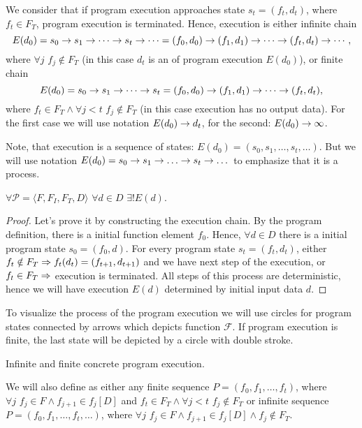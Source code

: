 We consider that if program execution approaches state $s_t = (f_t, d_t)$,
where $f_t \in F_T$, program execution is terminated.
Hence, execution is either infinite chain
\[E(d_0) = s_0 \rightarrow s_1 \rightarrow \cdots \rightarrow s_t \rightarrow \cdots =
        (f_0, d_0) \rightarrow (f_1, d_1) \rightarrow \cdots \rightarrow (f_t, d_t) \rightarrow \cdots,\]
where $\forall j \,\, f_j \notin F_T$ (in this case $d_t$ is an
 of program execution $E(d_0)$),
or finite chain
\[E(d_0) = s_0 \rightarrow s_1 \rightarrow \cdots \rightarrow s_t =
        (f_0, d_0) \rightarrow (f_1, d_1) \rightarrow \cdots \rightarrow (f_t, d_t),\]
where $f_t \in F_T \land \forall j < t \,\, f_j \notin F_T$
(in this case execution has no output data).
For the first case we will use notation $E(d_0) \rightarrow d_t$,
for the second: $E(d_0) \rightarrow \infty$.

Note, that execution is a sequence of states:
$E(d_0) = (s_0, s_1, \dots, s_t, \dots)$.
But we will use notation
$E(d_0) = s_0 \ra s_1 \ra \dots \ra s_t \ra \dots$
to emphasize that it is a process.

\begin{lemma}
    \label{exists_one_execution}
    $\forall \mathcal{P} = \langle F, F_I, F_T, D \rangle \,\,
    \forall d \in D \,\, \exists! E(d)$.
\end{lemma}

\begin{proof}
    Let's prove it by constructing the execution chain.
    By the program definition, there is a initial function element $f_0$.
    Hence, $\forall d \in D$
    there is a initial program state $s_0 = (f_0, d)$.
    For every program state $s_t = (f_t, d_t)$,
    either $f_t \notin F_T \Rightarrow f_t(d_t) = (f_{t + 1}, d_{t + 1})$
        and we have next step of the execution,
    or $f_t \in F_T \Rightarrow$ execution is terminated.
    All steps of this process are deterministic,
    hence we will have execution $E(d)$ determined by initial input data $d$.
\end{proof}

To visualize the process of the program execution we will use circles
for program states connected by arrows which depicts function $\mathcal{F}$.
If program execution is finite, the last state will be depicted by
a circle with double stroke.

    {Infinite and finite concrete program execution.}

We will also define  as either any finite sequence
$P = (f_0, f_1, \dots, f_t)$, where
$\forall j \,\, f_j \in F \land f_{j + 1} \in f_j[D]$
and $f_t \in F_T \land \forall j < t \,\, f_j \notin F_T$
or infinite sequence $P = (f_0, f_1, \dots, f_t, \dots)$, where
$\forall j \,\, f_j \in F \land f_{j + 1} \in f_j[D] \land f_j \notin F_T$.

